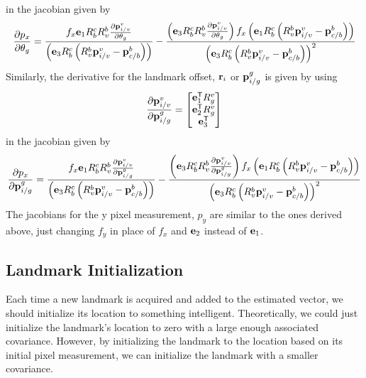in the jacobian given by
\begin{equation}
  \frac{\partial p_x}{\partial \theta_g} =
  \frac{f_x \boldsymbol{\mathrm{e}}_1 R_b^c R_v^b \frac{\partial \boldsymbol{\mathrm{p}}_{i/v}^v}{\partial \theta_g}}
    {\left(\boldsymbol{\mathrm{e}}_3 R_b^c \left(R_v^b \boldsymbol{\mathrm{p}}_{i/v}^v -
    \boldsymbol{\mathrm{p}}_{c/b}^b\right)\right)}
    - \frac{\left(\boldsymbol{\mathrm{e}}_3 R_b^c R_v^b \frac{\partial \boldsymbol{\mathrm{p}}_{i/v}^v}{\partial \theta_g} \right) f_x \left(\boldsymbol{\mathrm{e}}_1 R_b^c \left(R_v^b \boldsymbol{\mathrm{p}}_{i/v}^v -
        \boldsymbol{\mathrm{p}}_{c/b}^b\right)\right)} {\left(\boldsymbol{\mathrm{e}}_3 R_b^c \left(R_v^b \boldsymbol{\mathrm{p}}_{i/v}^v -
  \boldsymbol{\mathrm{p}}_{c/b}^b\right)\right)^2}
\end{equation}
Similarly, the derivative for the landmark offset, $\boldsymbol{\mathrm{r}}_i$ or
$\boldsymbol{\mathrm{p}}_{i/g}^g$ is given by using
\begin{equation}
  \frac{\partial \boldsymbol{\mathrm{p}}_{i/v}^v}{\partial \boldsymbol{\mathrm{p}}_{i/g}^g} =
  \begin{bmatrix}
    \boldsymbol{\mathrm{e}}_1^{\mathsf{T}} R_g^v \\
    \boldsymbol{\mathrm{e}}_2^{\mathsf{T}} R_g^v \\
    \boldsymbol{\mathrm{e}}_3^{\mathsf{T}}
  \end{bmatrix}
\end{equation}
in the jacobian given by
\begin{equation}
  \frac{\partial p_x}{\partial \boldsymbol{\mathrm{p}}_{i/g}^g} =
  \frac{f_x \boldsymbol{\mathrm{e}}_1 R_b^c R_v^b \frac{\partial \boldsymbol{\mathrm{p}}_{i/v}^v}{\partial \boldsymbol{\mathrm{p}}_{i/g}^g}}
    {\left(\boldsymbol{\mathrm{e}}_3 R_b^c \left(R_v^b \boldsymbol{\mathrm{p}}_{i/v}^v -
    \boldsymbol{\mathrm{p}}_{c/b}^b\right)\right)}
    - \frac{\left(\boldsymbol{\mathrm{e}}_3 R_b^c R_v^b \frac{\partial \boldsymbol{\mathrm{p}}_{i/v}^v}{\partial \boldsymbol{\mathrm{p}}_{i/g}^g} \right) f_x \left(\boldsymbol{\mathrm{e}}_1 R_b^c \left(R_v^b \boldsymbol{\mathrm{p}}_{i/v}^v -
        \boldsymbol{\mathrm{p}}_{c/b}^b\right)\right)} {\left(\boldsymbol{\mathrm{e}}_3 R_b^c \left(R_v^b \boldsymbol{\mathrm{p}}_{i/v}^v -
  \boldsymbol{\mathrm{p}}_{c/b}^b\right)\right)^2}
\end{equation}
The jacobians for the y pixel measurement, $p_y$ are similar to the ones derived
above, just changing $f_y$ in place of $f_x$ and $\boldsymbol{\mathrm{e}}_2$ instead of $\boldsymbol{\mathrm{e}}_1$.

\subsection{Landmark Initialization}
Each time a new landmark is acquired and added to the estimated vector, we
should initialize its location to something intelligent. Theoretically, we could
just initialize the landmark's location to zero with a large enough associated
covariance. However, by initializing the landmark to the location based on its
initial pixel measurement, we can initialize the landmark with a smaller
covariance.

